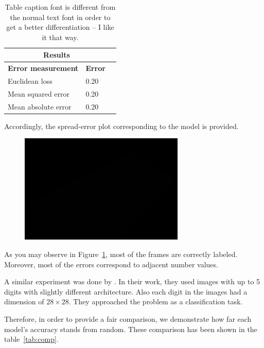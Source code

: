 \begin{table}[H]
\caption{Table caption font is different from the normal text font in order to get a better differentiation -- I like it that way.}
\label{tab:res}
\centering
\small\sffamily
\begin{tabular}{llr}
\multicolumn{2}{c}{\textbf{\textbf{Results}}} \\
\bottomrule
\textbf{Error measurement}        & \textbf{Error} \\
\bottomrule
Euclidean loss           & 0.20  \\
Mean squared error       & 0.20  \\
Mean absolute error      & 0.20  \\
\bottomrule
\end{tabular}
\end{table} 

Accordingly, the spread-error plot corresponding to the model is provided.

\begin{figure}[H]
	\centering
	{\includegraphics[width=0.7\textwidth]{images/1}}
	\caption{}
	\label{fig:splot}
\end{figure}

As you may observe in Figure~\ref{fig:splot}, most
of the frames are correctly labeled. Moreover, most of the errors correspond to adjacent number values.

\noindent A similar experiment was done by \citeauthor*{segui2015learning}. In their work, they used images with up to 5 digits with slightly different architecture. Also each digit in the images had a dimension of $28\times28$. They approached the problem as a classification task. 

\indent Therefore, in order to provide a fair comparison, we demonstrate how far each model's accuracy stands from random. These comparison has been shown in the table~\ref{tab:comp}.

